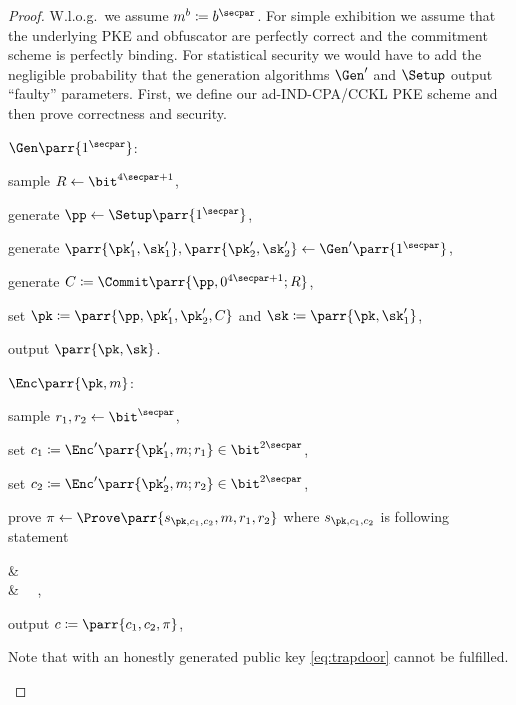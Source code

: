 \begin{proof}
    W.l.o.g.\ we assume \(m^b \coloneqq b^\secpar\).
    For simple exhibition we assume that the underlying PKE and obfuscator are perfectly correct and the commitment scheme is perfectly binding.
    For statistical security we would have to add the negligible probability that the generation algorithms \(\Gen'\) and \(\Setup\) output \enquote{faulty} parameters.
    First, we define our ad-IND-CPA/CCKL PKE scheme and then prove correctness and security.
    \begin{sitemize}
        \item \(\Gen\parr{1^\secpar}\):
        \begin{sitemize}
            \item sample \(R \gets \bit^{4\secpar+1}\),
            \item generate \(\pp \gets \Setup\parr{1^{\secpar}}\),
            \item generate \(\parr{\pk'_1,\sk'_1}, \parr{\pk'_2,\sk'_2} \gets \Gen'\parr{1^{\secpar}}\),
            \item generate \(C \coloneqq \Commit\parr{\pp,0^{4\secpar+1};R}\),
            \item set \(\pk \coloneqq \parr{\pp,\pk'_1,\pk'_2,C}\) and \(\sk \coloneqq \parr{\pk,\sk'_1}\),
            \item output \(\parr{\pk,\sk}\).
        \end{sitemize}

        \item \(\Enc\parr{\pk,m}\):
        \begin{sitemize}
            \item sample \(r_1,r_2 \gets \bit^\secpar\),
            \item set \(c_1 \coloneqq \Enc'\parr{\pk'_1,m;r_1} \in \bit^{2\secpar}\),
            \item set \(c_2 \coloneqq \Enc'\parr{\pk'_2,m;r_2} \in \bit^{2\secpar}\),
            \item prove \(\pi \gets \Prove\parr{s_{\pk,c_1,c_2},m,r_1,r_2}\) where \(s_{\pk,c_1,c_2}\) is following statement
            \begin{bralign}\label{eq:consistency}
                &\ 
                \\\label{eq:trapdoor}
                \vee
                &\ 
                \ ,
            \end{bralign}
            \item output \(c \coloneqq \parr{c_1,c_2,\pi}\),
        \end{sitemize}
        Note that with an honestly generated public key \cref{eq:trapdoor} cannot be fulfilled.


\end{sitemize}
\end{proof}
